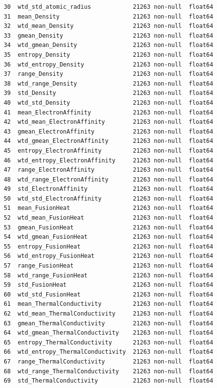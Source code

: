\begin{verbatim}
    30  wtd_std_atomic_radius            21263 non-null  float64
    31  mean_Density                     21263 non-null  float64
    32  wtd_mean_Density                 21263 non-null  float64
    33  gmean_Density                    21263 non-null  float64
    34  wtd_gmean_Density                21263 non-null  float64
    35  entropy_Density                  21263 non-null  float64
    36  wtd_entropy_Density              21263 non-null  float64
    37  range_Density                    21263 non-null  float64
    38  wtd_range_Density                21263 non-null  float64
    39  std_Density                      21263 non-null  float64
    40  wtd_std_Density                  21263 non-null  float64
    41  mean_ElectronAffinity            21263 non-null  float64
    42  wtd_mean_ElectronAffinity        21263 non-null  float64
    43  gmean_ElectronAffinity           21263 non-null  float64
    44  wtd_gmean_ElectronAffinity       21263 non-null  float64
    45  entropy_ElectronAffinity         21263 non-null  float64
    46  wtd_entropy_ElectronAffinity     21263 non-null  float64
    47  range_ElectronAffinity           21263 non-null  float64
    48  wtd_range_ElectronAffinity       21263 non-null  float64
    49  std_ElectronAffinity             21263 non-null  float64
    50  wtd_std_ElectronAffinity         21263 non-null  float64
    51  mean_FusionHeat                  21263 non-null  float64
    52  wtd_mean_FusionHeat              21263 non-null  float64
    53  gmean_FusionHeat                 21263 non-null  float64
    54  wtd_gmean_FusionHeat             21263 non-null  float64
    55  entropy_FusionHeat               21263 non-null  float64
    56  wtd_entropy_FusionHeat           21263 non-null  float64
    57  range_FusionHeat                 21263 non-null  float64
    58  wtd_range_FusionHeat             21263 non-null  float64
    59  std_FusionHeat                   21263 non-null  float64
    60  wtd_std_FusionHeat               21263 non-null  float64
    61  mean_ThermalConductivity         21263 non-null  float64
    62  wtd_mean_ThermalConductivity     21263 non-null  float64
    63  gmean_ThermalConductivity        21263 non-null  float64
    64  wtd_gmean_ThermalConductivity    21263 non-null  float64
    65  entropy_ThermalConductivity      21263 non-null  float64
    66  wtd_entropy_ThermalConductivity  21263 non-null  float64
    67  range_ThermalConductivity        21263 non-null  float64
    68  wtd_range_ThermalConductivity    21263 non-null  float64
    69  std_ThermalConductivity          21263 non-null  float64

\end{verbatim}
